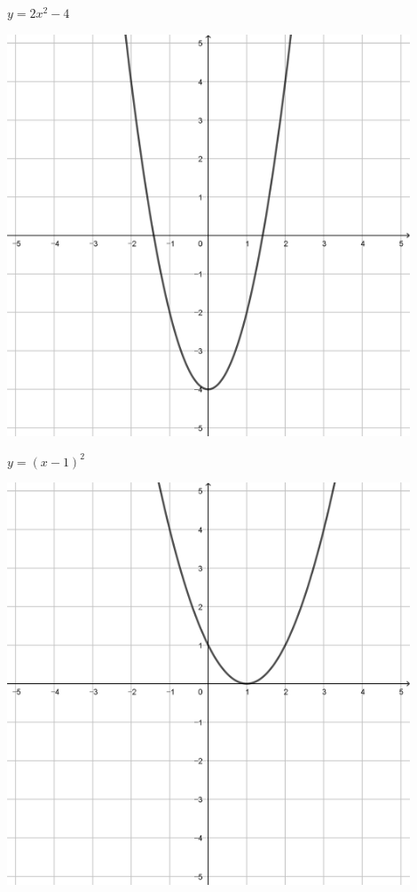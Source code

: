 \documentclass[a4paper]{oblivoir}
\begin{document}
\begin{minipage}{0.45\textwidth}\centering
\(y=2x^2-4\)
\par\bigskip\includegraphics[width=0.9\textwidth]{img/8-3}
\end{minipage}
\begin{minipage}{0.45\textwidth}\centering
\(y=(x-1)^2\)
\par\bigskip\includegraphics[width=0.9\textwidth]{img/8-4}
\end{minipage}\bigskip\bigskip\par
\end{document}
